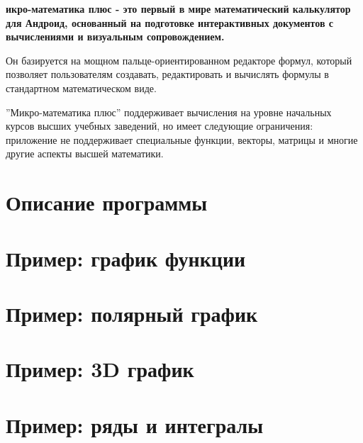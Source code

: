 \documentclass[DIV=calc, paper=a4, fontsize=11pt, twocolumn]{scrartcl}
\begin{document}
\maketitle
\thispagestyle{fancy} %

\textbf{икро-математика плюс - это первый в мире математический
калькулятор для Андроид, основанный на подготовке интерактивных документов с
вычислениями и визуальным сопровождением.}

\begin{bf}
Он базируется на мощном пальце-ориентированном редакторе формул, который
позволяет пользователям создавать, редактировать и вычислять формулы в
стандартном математическом виде.

''Микро-математика плюс'' поддерживает вычисления на уровне начальных курсов
высших учебных заведений, но имеет следующие ограничения: приложение не
поддерживает специальные функции, векторы, матрицы и многие другие аспекты
высшей математики.
\end{bf}

\section{Описание программы}


\section{Пример: график функции}


\section{Пример: полярный график}


\section{Пример: 3D график}


\section{Пример: ряды и интегралы}

\end{document}
